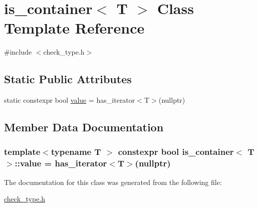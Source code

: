 \hypertarget{classis__container}{\section{is\-\_\-container$<$ T $>$ Class Template Reference}
\label{classis__container}
}


{\ttfamily \#include $<$check\-\_\-type.\-h$>$}

\subsection*{Static Public Attributes}
\begin{DoxyCompactItemize}
\item 
static constexpr bool \hyperlink{classis__container_abe72bf896680aa10340ccf08a5d293c7}{value} = has\-\_\-iterator$<$T$>$(nullptr)
\end{DoxyCompactItemize}


\subsection{Member Data Documentation}
\hypertarget{classis__container_abe72bf896680aa10340ccf08a5d293c7}{
\subsubsection[{value}]{\setlength{\rightskip}{0pt plus 5cm}template$<$typename T $>$ constexpr bool {\bf is\-\_\-container}$<$ T $>$\-::value = has\-\_\-iterator$<$T$>$(nullptr)\hspace{0.3cm}{\ttfamily [static]}}}\label{classis__container_abe72bf896680aa10340ccf08a5d293c7}


The documentation for this class was generated from the following file\-:\begin{DoxyCompactItemize}
\item 
\hyperlink{check__type_8h}{check\-\_\-type.\-h}\end{DoxyCompactItemize}
